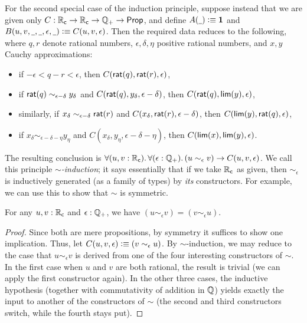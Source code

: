 For the second special case of the induction principle, suppose instead that we are given only $C:\mathbb{R}_\mathsf{c}\to\mathbb{R}_\mathsf{c}\to\mathbb{Q}_{+}\to\mathsf{Prop}$, and define $A(\mathord{\underline{\hspace{1ex}}})\vcentcolon\equiv\mathbf{1}$ and $B(u,v,\mathord{\underline{\hspace{1ex}}},\mathord{\underline{\hspace{1ex}}},\epsilon,\mathord{\underline{\hspace{1ex}}})\vcentcolon\equiv C(u,v,\epsilon)$.
Then the required data reduces to the following, where $q, r$ denote rational numbers, $\epsilon, \delta, \eta$ positive rational numbers, and $x, y$ Cauchy approximations:
\begin{itemize}
\item if $-\epsilon < q - r < \epsilon$, then $C(\mathsf{rat}(q),\mathsf{rat}(r),\epsilon)$,
\item if $\mathsf{rat}(q) \sim_{\epsilon - \delta} y_\delta$ and
  $C(\mathsf{rat}(q),y_\delta,\epsilon-\delta)$,
  then $C(\mathsf{rat}(q),\mathsf{lim}(y),\epsilon)$,
\item similarly, if $x_\delta \sim_{\epsilon - \delta} \mathsf{rat}(r)$ and
  $C(x_\delta,\mathsf{rat}(r),\epsilon-\delta)$,
  then $C(\mathsf{lim}(y),\mathsf{rat}(q),\epsilon)$,
\item if $x_\delta \sim_{\epsilon - \delta - \eta} y_\eta$ and
  $C(x_\delta,y_\eta,{\epsilon - \delta - \eta})$,
  then $C(\mathsf{lim}(x),\mathsf{lim}(y),\epsilon)$.
\end{itemize}
The resulting conclusion is $\fall{u,v:\RC}{\epsilon:\Qp} (u\sim_\epsilon v) \to C(u,v,\epsilon)$.
We call this principle \emph{$\sim$-induction}; it says essentially that if we take $\mathbb{R}_\mathsf{c}$ as given, then $\sim_\epsilon$ is inductively generated (as a family of types) by \emph{its} constructors.
For example, we can use this to show that $\sim$ is symmetric.

\begin{lem}\label{thm:RCsim-symmetric}
  For any $u,v:\mathbb{R}_\mathsf{c}$ and $\epsilon:\mathbb{Q}_{+}$, we have $(u\sim_\epsilon v) = (v\sim_\epsilon u)$.
\end{lem}
\begin{proof}
  Since both are mere propositions, by symmetry it suffices to show one implication.
  Thus, let $C(u,v,\epsilon) \vcentcolon\equiv (v\sim_\epsilon u)$.
  By $\sim$-induction, we may reduce to the case that $u\sim_\epsilon v$ is derived from one of the four interesting constructors of $\sim$.
  In the first case when $u$ and $v$ are both rational, the result is trivial (we can apply the first constructor again).
  In the other three cases, the inductive hypothesis (together with commutativity of addition in $\mathbb{Q}$) yields exactly the input to another of the constructors of $\sim$ (the second and third constructors switch, while the fourth stays put).
\end{proof}

